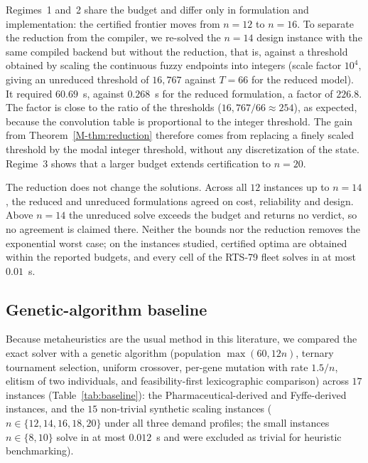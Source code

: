\documentclass[11pt]{article}
\begin{document}
Regimes~1 and~2 share the budget and differ only in formulation and implementation: the certified
frontier moves from $n=12$ to $n=16$. To separate the reduction from the compiler, we re-solved the
$n=14$ design instance with the same compiled backend but without the reduction, that is, against a
threshold obtained by scaling the continuous fuzzy endpoints into integers (scale factor $10^4$, giving
an unreduced threshold of $16{,}767$ against $T=66$ for the reduced model). It required $60.69$~s,
against $0.268$~s for the reduced formulation, a factor of $226.8$. The factor is close to the ratio of
the thresholds ($16{,}767 / 66 \approx 254$), as expected, because the convolution table is
proportional to the integer threshold. The gain from Theorem~\ref*{M-thm:reduction} therefore comes from replacing a finely
scaled threshold by the modal integer threshold, without any discretization of the state. Regime~3
shows that a larger budget extends certification to $n = 20$.

The reduction does not change the solutions. Across all $12$ instances up to $n=14$, the reduced and
unreduced formulations agreed on cost, reliability and design. Above $n=14$ the unreduced solve
exceeds the budget and returns no verdict, so no agreement is claimed there. Neither the bounds nor the
reduction removes the exponential worst case; on the instances studied, certified optima are obtained
within the reported budgets, and every cell of the RTS-79 fleet solves in at most $0.01$~s.

\subsection{Genetic-algorithm baseline}
Because metaheuristics are the usual method in this literature, we compared the exact solver with a
genetic algorithm (population $\max(60, 12n)$, ternary tournament selection, uniform crossover, per-gene mutation with rate $1.5/n$, elitism of two individuals, and feasibility-first lexicographic comparison) across $17$ instances (Table~\ref{tab:baseline}): the Pharmaceutical-derived and Fyffe-derived instances, and the $15$ non-trivial synthetic scaling instances ($n \in \{12, 14, 16, 18, 20\}$ under all three demand profiles; the small instances $n \in \{8, 10\}$ solve in at most $0.012$~s and were excluded as trivial for heuristic benchmarking).
\end{document}
